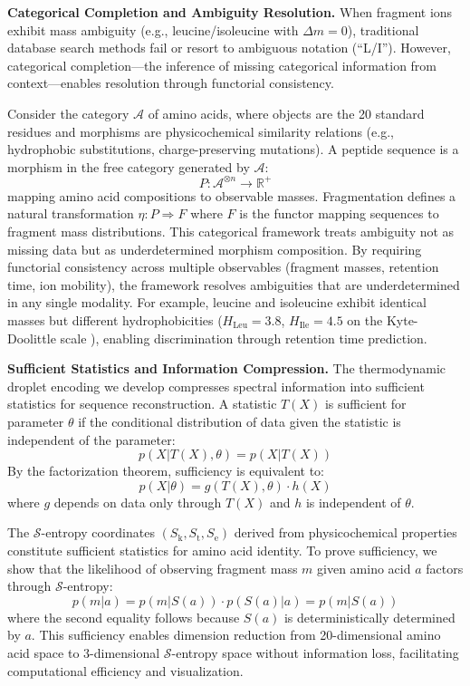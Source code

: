 \documentclass[11pt,twocolumn]{article}
\newcommand{\sentropy}{$\mathcal{S}$-entropy}
\newcommand{\Sk}{S_{\text{k}}}
\newcommand{\St}{S_{\text{t}}}
\newcommand{\Se}{S_{\text{e}}}
\begin{document}
\textbf{Categorical Completion and Ambiguity Resolution.} When fragment ions exhibit mass ambiguity (e.g., leucine/isoleucine with $\Delta m = 0$), traditional database search methods fail or resort to ambiguous notation (``L/I''). However, categorical completion---the inference of missing categorical information from context---enables resolution through functorial consistency. 

Consider the category $\mathcal{A}$ of amino acids, where objects are the 20 standard residues and morphisms are physicochemical similarity relations (e.g., hydrophobic substitutions, charge-preserving mutations). A peptide sequence is a morphism in the free category generated by $\mathcal{A}$:
\begin{equation}
    P: \mathcal{A}^{\otimes n} \rightarrow \mathbb{R}^+
\end{equation}
mapping amino acid compositions to observable masses. Fragmentation defines a natural transformation $\eta: P \Rightarrow F$ where $F$ is the functor mapping sequences to fragment mass distributions. This categorical framework treats ambiguity not as missing data but as underdetermined morphism composition. By requiring functorial consistency across multiple observables (fragment masses, retention time, ion mobility), the framework resolves ambiguities that are underdetermined in any single modality. For example, leucine and isoleucine exhibit identical masses but different hydrophobicities ($H_{\text{Leu}} = 3.8$, $H_{\text{Ile}} = 4.5$ on the Kyte-Doolittle scale \cite{kyte1982hydropathy}), enabling discrimination through retention time prediction.

\textbf{Sufficient Statistics and Information Compression.} The thermodynamic droplet encoding we develop compresses spectral information into sufficient statistics for sequence reconstruction. A statistic $T(X)$ is sufficient for parameter $\theta$ if the conditional distribution of data given the statistic is independent of the parameter:
\begin{equation}
    p(X | T(X), \theta) = p(X | T(X))
\end{equation}
By the factorization theorem, sufficiency is equivalent to:
\begin{equation}
    p(X | \theta) = g(T(X), \theta) \cdot h(X)
\end{equation}
where $g$ depends on data only through $T(X)$ and $h$ is independent of $\theta$.

The \sentropy{} coordinates $(\Sk, \St, \Se)$ derived from physicochemical properties constitute sufficient statistics for amino acid identity. To prove sufficiency, we show that the likelihood of observing fragment mass $m$ given amino acid $a$ factors through \sentropy{}:
\begin{equation}
    p(m | a) = p(m | S(a)) \cdot p(S(a) | a) = p(m | S(a))
\end{equation}
where the second equality follows because $S(a)$ is deterministically determined by $a$. This sufficiency enables dimension reduction from 20-dimensional amino acid space to 3-dimensional \sentropy{} space without information loss, facilitating computational efficiency and visualization.
\end{document}
